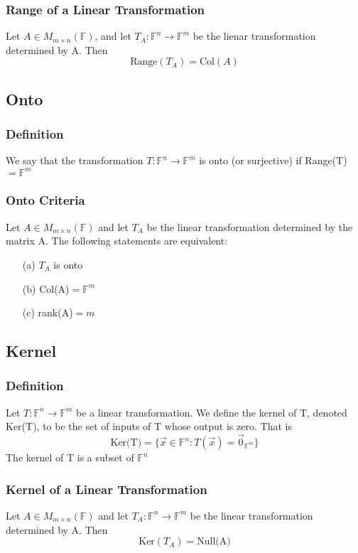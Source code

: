 \documentclass[12pt, letterpaper]{article}
\begin{document}
\subsubsection{Range of a Linear Transformation}
Let $A\in M_{m\times n}(\mathbb{F})$, and let $T_A: \mathbb{F}^n\rightarrow\mathbb{F}^m$ be the lienar transformation determined by A. Then
\[\text{Range}(T_A) = \text{Col}(A)\]
\subsection{Onto}
\subsubsection{Definition}
We say that the transformation $T: \mathbb{F}^n\rightarrow\mathbb{F}^m$ is onto (or surjective) if 
Range(T)$=\mathbb{F}^m$
\subsubsection{Onto Criteria}
Let $A\in M_{m\times n}(\mathbb{F})$ and let $T_A$ be the linear transformation determined by the matrix A. The following statements are equivalent: 
\begin{itemize}
    \item[(a)] $T_A$ is onto 
    \item[(b)] Col(A)$=\mathbb{F}^m$
    \item[(c)] rank(A)$=m$
\end{itemize}
\subsection{Kernel}
\subsubsection{Definition}
Let $T: \mathbb{F}^n \rightarrow\mathbb{F}^m$ be a linear transformation. We define the kernel of T, denoted Ker(T),
to be the set of inputs of T whose output is zero. That is 
\[\text{Ker(T)} = \{\vec{x}\in\mathbb{F}^n: T(\vec{x}) = \vec{0}_{\mathbb{F}^m}\}\]
The kernel of T is a subset of $\mathbb{F}^n$
\subsubsection{Kernel of a Linear Transformation}
Let $A\in M_{m\times n}(\mathbb{F})$ and let $T_A: \mathbb{F}^n\rightarrow\mathbb{F}^m$ be the linear transformation determined by A. Then 
\[\text{Ker}(T_A) = \text{Null(A)}\]
\end{document}
